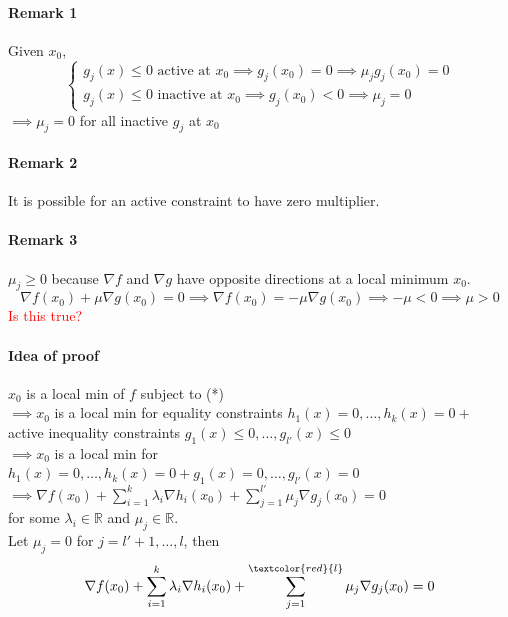 \documentclass[11pt]{article}
\newcommand{\real}[0]{\mathbb{R}}
\begin{document}
\paragraph{Remark 1}
Given $x_0$, 
$$
\begin{cases}
g_j(x) \leq 0 \text{ active at } x_0 \implies g_j(x_0) = 0 \implies \mu_jg_j(x_0) = 0 \\
g_j(x) \leq 0 \text{ inactive at } x_0 \implies g_j(x_0) < 0 \implies \mu_j = 0
\end{cases}
$$
$\implies \mu_j = 0$ for all inactive $g_j$ at $x_0$

\paragraph{Remark 2}
It is possible for an active constraint to have zero multiplier.

\paragraph{Remark 3}
$\mu_j \geq 0$ because $\nabla f$ and $\nabla g$ have opposite directions at a local minimum $x_0$. \\
$$\nabla f(x_0) + \mu \nabla g(x_0) = 0 \implies \nabla f(x_0) = -\mu \nabla g(x_0) \implies -\mu < 0 \implies \mu > 0 $$
\textcolor{red}{Is this true?}

\paragraph{Idea of proof}
$x_0$ is a local min of $f$ subject to (*) \\
$\implies x_0$ is a local min for equality constraints $h_1(x) = 0, \hdots, h_k(x) = 0 +$ active inequality constraints $g_1(x) \leq 0, \hdots, g_{l'}(x) \leq 0$ \\
$\implies x_0$ is a local min for $h_1(x) = 0, \hdots, h_k(x) = 0 + g_1(x) = 0, \hdots, g_{l'}(x) = 0$ 
$\implies \nabla f(x_0) + \sum_{i=1}^k \lambda_i \nabla h_i(x_0) + \sum_{j=1}^{l'} \mu_j \nabla g_j(x_0) = 0$\\
for some $\lambda_i \in \real$ and $\mu_j \in \real$.\\
Let $\mu_j = 0$ for $j = l' + 1, \hdots, l$,
then 
$$\nabla f(x_0) + \sum_{i=1}^k \lambda_i \nabla h_i(x_0) + \sum_{j=1}^{\textcolor{red}{l}} \mu_j \nabla g_j(x_0) = 0$$
\end{document}
